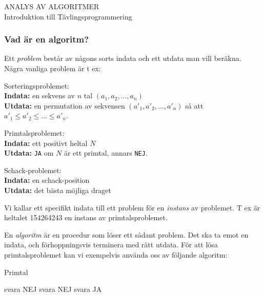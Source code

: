 \documentclass[10pt,a4paper]{article}
\theoremstyle{problem}
\begin{document}
\Large{ANALYS AV ALGORITMER}
\\
\small{Introduktion till Tävlingsprogrammering}

\subsubsection*{Vad är en algoritm?}
Ett \emph{problem} består av någons sorts indata och ett utdata man vill beräkna. Några vanliga problem är t ex:

Sorteringsproblemet: \\
\textbf{Indata:} en sekvens av $n$ tal $(a_1, a_2, ..., a_n)$ \\
\textbf{Utdata:} en permutation av sekvensen $(a'_1, a'_2, ..., a'_n)$ så att $a'_1 \le a'_2 \le ... \le a'_n$.

Primtalsproblemet: \\
\textbf{Indata:} ett positivt heltal $N$ \\
\textbf{Utdata:} \texttt{JA} om $N$ är ett primtal, annars \texttt{NEJ}.

Schack-problemet: \\
\textbf{Indata:} en schack-position\\
\textbf{Utdata:} det bästa möjliga draget

Vi kallar ett specifikt indata till ett problem för en \emph{instans} av problemet. T ex är heltalet 154264243 en instans av primtalsproblemet.

En \emph{algoritm} är en procedur som löser ett sådant problem. Det ska ta emot en indata, och förhoppningsvis terminera med rätt utdata.
För att lösa primtalsproblemet kan vi exempelvis använda oss av följande algoritm:

\begin{algorithm}
\caption{Primtal}\label{alg:primes}
\begin{algorithmic}[1]
\State svara NEJ 
\EndIf
{}
\State svara NEJ 
\EndIf
\EndFor
\State svara JA 
\EndProcedure
\end{algorithmic}
\end{algorithm}
\end{document}
